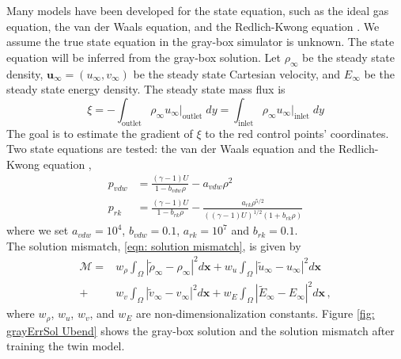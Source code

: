 Many models have been developed for the state equation, such as the ideal gas equation, the
van der Waals equation, and the Redlich-Kwong equation \cite{state eqns}.
We assume the true state equation in the gray-box simulator is unknown. 
The state equation will be inferred from the gray-box solution. 
Let $\rho_\infty$ be the steady state density,
$\boldsymbol{u}_\infty = (u_\infty, v_\infty)$ be the steady state Cartesian velocity,
and $E_\infty$ be the steady state energy density.
The steady state mass flux is
\begin{equation}
    \xi = - \int_{\textrm{outlet}} \rho_\infty u_\infty \big|_{\textrm{outlet}} \; dy=
    \int_{\textrm{inlet}} \rho_\infty u_\infty\big|_{\textrm{inlet}} \; dy
    \label{eqn: mass flux}
\end{equation}
The goal is to estimate the gradient of $\xi$
to the red control points' coordinates.
\\

Two state equations are tested: the van der Waals equation and the Redlich-Kwong equation
\cite{aero book, Redlich Kwong},
\begin{equation}\begin{split}
    p_{vdw} &= \frac{(\gamma-1)U}{1-b_{vdw}\rho} - a_{vdw}\rho^2\\
    p_{rk} &= \frac{(\gamma-1)U}{1-b_{rk}\rho} - 
    \frac{a_{rk}\rho^{5/2}}{((\gamma-1)U)^{1/2}(1+b_{rk}\rho)}
\end{split}\label{NS state equations}
\end{equation}
where we set $a_{vdw}=10^4$, $b_{vdw}=0.1$, $a_{rk}=10^7$ and $b_{rk}=0.1$.\\

The solution mismatch, \eqref{eqn: solution mismatch}, is given by
\begin{equation*}\begin{split}
    \mathcal{M} = &w_\rho \int_\Omega \left|\tilde{\rho}_{\infty} - \rho_{\infty}\right|^2 d\boldsymbol{x}
                + w_u
                \int_\Omega \left|\tilde{u}_{\infty}- u_{\infty}\right|^2 d\boldsymbol{x} \\
                + &w_v
                \int_\Omega \left| \tilde{v}_{\infty}- v_{\infty}\right|^2 d\boldsymbol{x}
                + w_E
                \int_\Omega \left|\tilde{E}_{\infty} - E_\infty\right|^2 d\boldsymbol{x}\,,
    \label{NS mismatch}
\end{split}\end{equation*}
where $w_\rho$, $w_u$, $w_v$, and $w_E$ are non-dimensionalization constants.
Figure \ref{fig: grayErrSol Ubend} shows the gray-box solution and the solution mismatch
after training the twin model.\\

